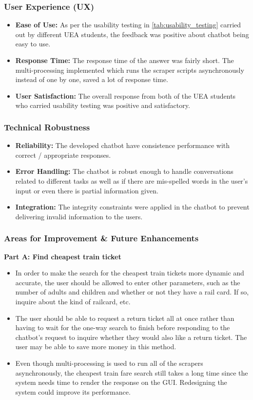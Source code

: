 \subsubsection{User Experience (UX)}
\begin{itemize}
    \item \textbf{Ease of Use:} As per the usability testing in \ref{tab:usability_testing} carried out by different UEA students, the feedback was positive about chatbot being easy to use.
    \item \textbf{Response Time:} The response time of the answer was fairly short. The multi-processing implemented which runs the scraper scripts asynchronously instead of one by one, saved a lot of response time.
    \item \textbf{User Satisfaction:} The overall response from both of the UEA students who carried usability testing was positive and satisfactory.
\end{itemize} 

\subsubsection{Technical Robustness}
\begin{itemize}
    \item \textbf{Reliability:} The developed chatbot have consistence performance with correct / appropriate responses.
    \item \textbf{Error Handling:} The chatbot is robust enough to handle conversations related to different tasks as well as if there are mis-spelled words in the user's input or even there is partial information given.
    \item \textbf{Integration:} The integrity constraints were applied in the chatbot to prevent delivering invalid information to the users.
\end{itemize}

\subsubsection{Areas for Improvement \& Future Enhancements}
\textbf{Part A: Find cheapest train ticket}

\begin{itemize}
    \item In order to make the search for the cheapest train tickets more dynamic and accurate, the user should be allowed to enter other parameters, such as the number of adults and children and whether or not they have a rail card. If so, inquire about the kind of railcard, etc.
    \item The user should be able to request a return ticket all at once rather than having to wait for the one-way search to finish before responding to the chatbot's request to inquire whether they would also like a return ticket. The user may be able to save more money in this method.
    \item Even though multi-processing is used to run all of the scrapers asynchronously, the cheapest train fare search still takes a long time since the system needs time to render the response on the GUI. Redesigning the system could improve its performance.
\end{itemize}

